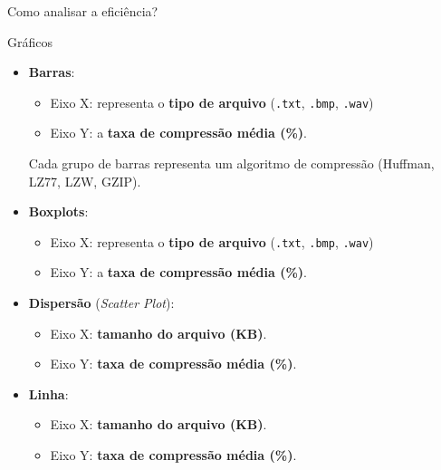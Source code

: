 \documentclass{beamer}
\begin{document}
    \begin{frame}{Como analisar a eficiência?}
        \begin{block}{Gráficos}
            \begin{itemize}
                \item \textbf{Barras}: 
                    \begin{itemize}
                        \item Eixo X: representa o \textbf{tipo de arquivo} (\texttt{.txt}, \texttt{.bmp},
                                \texttt{.wav})
                        \item Eixo Y: a \textbf{taxa de compressão média (\%)}.
                    \end{itemize}
                    Cada grupo de barras representa um algoritmo de compressão (Huffman, LZ77, LZW, GZIP).
                \item \textbf{Boxplots}: 
                    \begin{itemize}
                        \item Eixo X: representa o \textbf{tipo de arquivo} (\texttt{.txt}, \texttt{.bmp},
                                \texttt{.wav})
                        \item Eixo Y: a \textbf{taxa de compressão média (\%)}.
                    \end{itemize}
                \item \textbf{Dispersão} (\textit{Scatter Plot}):
                    \begin{itemize}
                        \item Eixo X: \textbf{tamanho do arquivo (KB)}.
                        \item Eixo Y: \textbf{taxa de compressão média (\%)}.
                    \end{itemize}
                \item \textbf{Linha}:
                    \begin{itemize}
                        \item Eixo X: \textbf{tamanho do arquivo (KB)}.
                        \item Eixo Y: \textbf{taxa de compressão média (\%)}.
                    \end{itemize}
            \end{itemize}
        \end{block}
    \end{frame}
\end{document}
